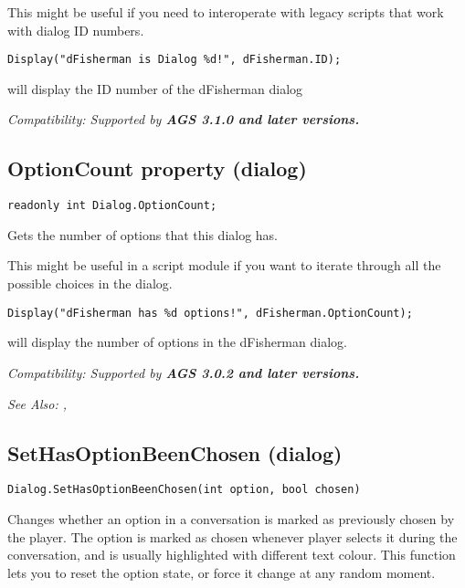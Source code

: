 This might be useful if you need to interoperate with legacy scripts
that work with dialog ID numbers.

\begin{verbatim}
Display("dFisherman is Dialog %d!", dFisherman.ID);
\end{verbatim}
will display the ID number of the dFisherman dialog

\it{Compatibility:} Supported by \bf{AGS 3.1.0} and later versions.


\subsection{OptionCount property (dialog)}\label{Dialog.OptionCount}%

\begin{verbatim}
readonly int Dialog.OptionCount;
\end{verbatim}
Gets the number of options that this dialog has.

This might be useful in a script module if you want to iterate through all
the possible choices in the dialog.

\begin{verbatim}
Display("dFisherman has %d options!", dFisherman.OptionCount);
\end{verbatim}
will display the number of options in the dFisherman dialog.

\it{Compatibility:} Supported by \bf{AGS 3.0.2} and later versions.

\it{See Also:} ,

\subsection{SetHasOptionBeenChosen (dialog)}\label{Dialog.SetHasOptionBeenChosen}%

\begin{verbatim}
Dialog.SetHasOptionBeenChosen(int option, bool chosen)
\end{verbatim}
Changes whether an option in a conversation is marked as previously chosen by the player. The option is marked as chosen whenever player selects it during the conversation, and is usually highlighted with different text colour. This function lets you to reset the option state, or force it change at any random moment.

